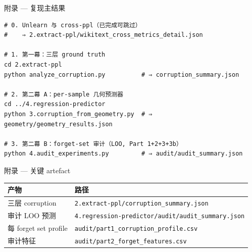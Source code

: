 \documentclass[aspectratio=169,10pt]{beamer}
\begin{document}
\appendix

\begin{frame}[fragile]{附录 — 复现主结果}
    \footnotesize
\begin{verbatim}
# 0. Unlearn 与 cross-ppl（已完成可跳过）
#    ⇒ 2.extract-ppl/wikitext_cross_metrics_detail.json

# 1. 第一幕：三层 ground truth
cd 2.extract-ppl
python analyze_corruption.py          # ⇒ corruption_summary.json

# 2. 第二幕 A：per-sample 几何预测器
cd ../4.regression-predictor
python 3.corruption_from_geometry.py  # ⇒ geometry/geometry_results.json

# 3. 第二幕 B：forget-set 审计（LOO, Part 1+2+3+3b）
python 4.audit_experiments.py         # ⇒ audit/audit_summary.json
\end{verbatim}
\end{frame}

\begin{frame}{附录 — 关键 artefact}
    \footnotesize
    \begin{tabular}{@{}ll@{}}
        \toprule
        产物 & 路径 \\
        \midrule
        三层 corruption       & \texttt{2.extract-ppl/corruption\_summary.json} \\
        审计 LOO 预测          & \texttt{4.regression-predictor/audit/audit\_summary.json} \\
        每 forget set profile  & \texttt{audit/part1\_corruption\_profile.csv} \\
        审计特征               & \texttt{audit/part2\_forget\_features.csv} \\
        \bottomrule
    \end{tabular}
\end{frame}
\end{document}
